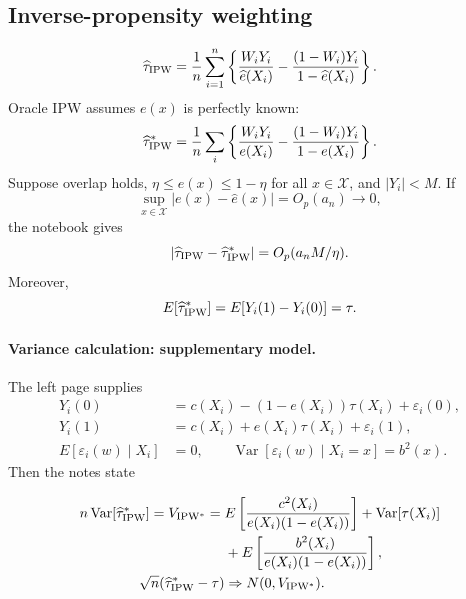 \subsection{Inverse-propensity weighting}
\[
\widehat\tau_{\rm IPW}=\frac1n\sum_{i=1}^n
\left\{\frac{W_iY_i}{\widehat e(X_i)}-\frac{(1-W_i)Y_i}{1-\widehat e(X_i)}\right\}.
\]
Oracle IPW assumes $e(x)$ is perfectly known:
\[
\widehat\tau^*_{\rm IPW}=\frac1n\sum_i
\left\{\frac{W_iY_i}{e(X_i)}-\frac{(1-W_i)Y_i}{1-e(X_i)}\right\}.
\]
Suppose overlap holds, $\eta\leq e(x)\leq1-\eta$ for all $x\in\mathcal X$, and $|Y_i|<M$. If
\[
\sup_{x\in\mathcal X}|e(x)-\widehat e(x)|=O_p(a_n)\longrightarrow0,
\]
the notebook gives
\[
|\widehat\tau_{\rm IPW}-\widehat\tau^*_{\rm IPW}|=O_p(a_nM/\eta).
\]
 Moreover,
\[
E[\widehat\tau^*_{\rm IPW}]=E[Y_i(1)-Y_i(0)]=\tau.
\]
\paragraph{Variance calculation: supplementary model.}
The left page supplies
\begin{align*}
Y_i(0)&=c(X_i)-(1-e(X_i))\tau(X_i)+\varepsilon_i(0),\\
Y_i(1)&=c(X_i)+e(X_i)\tau(X_i)+\varepsilon_i(1),\\
E[\varepsilon_i(w)\mid X_i]&=0,\qquad
\operatorname{Var}[\varepsilon_i(w)\mid X_i=x]=b^2(x).
\end{align*}
Then the notes state

\begin{align*}
n\operatorname{Var}[\widehat\tau^*_{\rm IPW}]
=V_{\rm IPW^*}
={}&E\left[\frac{c^2(X_i)}{e(X_i)(1-e(X_i))}\right]
+\operatorname{Var}[\tau(X_i)]\\
&+E\left[\frac{b^2(X_i)}{e(X_i)(1-e(X_i))}\right],\\
\sqrt n(\widehat\tau^*_{\rm IPW}-\tau)&\Rightarrow N(0,V_{\rm IPW^*}).
\end{align*}
